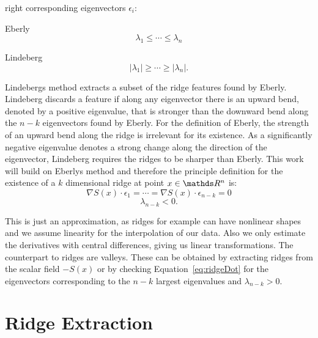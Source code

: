 right corresponding eigenvectors $\epsilon_i$:\\
\begin{inparaenum}[(a)]
  \item Eberly
  \begin{equation}\label{eq:Eberly}
   \lambda_1 \leq \cdots \leq \lambda_n
  \end{equation}
  \item Lindeberg
  \begin{equation}
    \lvert \lambda_1 \rvert \geq \cdots \geq \lvert \lambda_n \rvert.
  \end{equation}
\end{inparaenum}
\noindent Lindebergs method extracts a subset of the ridge features
found by Eberly. Lindeberg discards a feature if along any eigenvector
there is an upward bend, denoted by a positive eigenvalue, that is
stronger than the downward bend along the $n-k$ eigenvectors found by
Eberly. For the definition of Eberly, the strength of an upward bend
along the ridge is irrelevant for its existence. As a significantly
negative eigenvalue denotes a strong change along the direction of the
eigenvector, Lindeberg requires the ridges to be sharper than Eberly.
This work will build on Eberlys method and therefore the principle
definition for the existence of a $k$ dimensional ridge at point $x
\in \real^n$ is:\\

\begin{equation}\label{eq:ridgeDot}
  \nabla S(x) \cdot \epsilon_1 = \cdots = \nabla S(x) \cdot \epsilon_{n-k} = 0
\end{equation}
\begin{equation}\label{eq:ridgeEV}
  \lambda_{n-k} < 0.
\end{equation}

\noindent This is just an approximation, as ridges for example can have
nonlinear shapes and we assume linearity for the interpolation of our
data. Also we only estimate the derivatives with central differences,
giving us linear transformations. The counterpart to ridges are valleys.
These can be obtained by extracting ridges from the scalar field $-S(x)$
or by checking Equation~\ref{eq:ridgeDot} for the eigenvectors
corresponding to the $n-k$ largest eigenvalues and $\lambda_{n-k} > 0$.

\section{Ridge Extraction}

